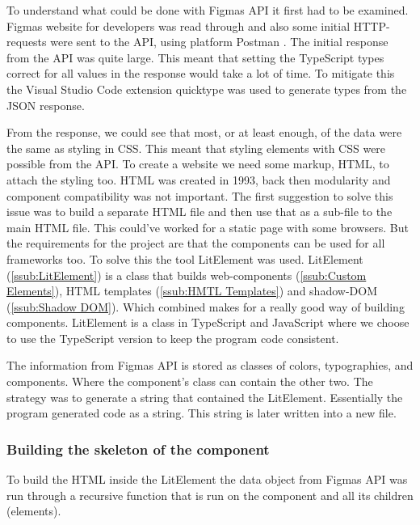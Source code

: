 To understand what could be done with Figmas API it first had to be examined. Figmas website for developers\cite{figmaFigma} was read through and also some initial HTTP-requests were sent to the API, using platform Postman \cite{PostmanCollaborationPlatform}. The initial response from the API was quite large. This meant that setting the TypeScript types correct for all values in the response would take a lot of time. To mitigate this the Visual Studio Code \cite{VisualStudioCode} extension quicktype\cite{ConvertJSONSwift} was used to generate types from the JSON response. 

From the response, we could see that most, or at least enough, of the data were the same as styling in CSS. This meant that styling elements with CSS were possible from the API. To create a website we need some markup, HTML, to attach the styling too. HTML was created in 1993, back then modularity and component compatibility was not important. The first suggestion to solve this issue was to build a separate HTML file and then use that as a sub-file to the main HTML file. This could've worked for a static page with some browsers. But the requirements for the project are that the components can be used for all frameworks too. To solve this the tool LitElement was used. LitElement (\ref{ssub:LitElement}) is a class that builds web-components (\ref{ssub:Custom Elements}), HTML templates (\ref{ssub:HMTL Templates}) and shadow-DOM (\ref{ssub:Shadow DOM}). Which combined makes for a really good way of building components. LitElement is a class in TypeScript and JavaScript where we choose to use the TypeScript version to keep the program code consistent. 

The information from Figmas API is stored as classes of colors, typographies, and components. Where the component's class can contain the other two.  The strategy was to generate a string that contained the LitElement. Essentially the program generated code as a string. This string is later written into a new file.

\subsubsection{Building the skeleton of the component}%
\label{ssub:building the skeleton of the component}
To build the HTML inside the LitElement the data object from Figmas API was run through a recursive function that is run on the component and all its children (elements).

